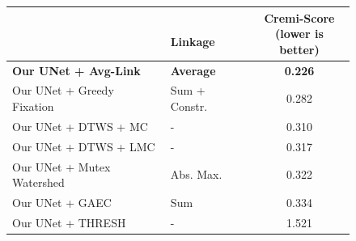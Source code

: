 \begin{figure}[t]
        \centering
\begin{minipage}[t]{0.56\textwidth}
    \centering
    \scriptsize
        \begin{tabular}[t]{l|l|c}
         & \makecell[l]{\algname{}\\ Linkage} & \makecell{Cremi-Score \\(lower is better)} \\ \midrule 
\textbf{Our UNet + \algname{} Avg-Link} & \textbf{Average}& \textbf{0.226}  \\
Our UNet + Greedy Fixation \cite{levinkov2017comparative} & Sum + Constr. & 0.282 \\
Our UNet + DTWS + MC & -& 0.310 \\
Our UNet + DTWS + LMC & -& 0.317 \\
Our UNet + Mutex Watershed \cite{wolf2018mutex} & Abs. Max.  & 0.322 \\
Our UNet + GAEC \cite{keuper2015efficient} & Sum & 0.334 \\
Our UNet + THRESH &-& 1.521 \\ 

\end{tabular}
\end{minipage}
\end{figure}
